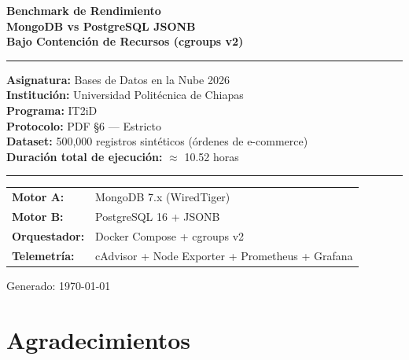 \documentclass[12pt,a4paper]{article}
\begin{document}

\begin{titlepage}
  \centering
  \vspace*{1cm}

  {\Huge\bfseries\color{headerbg}
    Benchmark de Rendimiento\\[0.4em]
    \large\color{pgblue} MongoDB vs PostgreSQL JSONB\\
    \large\color{mongogreen} Bajo Contención de Recursos (cgroups v2)
  }

  \vspace{1.5cm}
  \rule{\linewidth}{0.5mm}
  \vspace{0.5cm}

  {\large
    \textbf{Asignatura:} Bases de Datos en la Nube 2026\\[0.3em]
    \textbf{Institución:} Universidad Politécnica de Chiapas\\[0.3em]
    \textbf{Programa:} IT2iD\\[0.3em]
    \textbf{Protocolo:} PDF §6 — Estricto\\[0.3em]
    \textbf{Dataset:} 500{,}000 registros sintéticos (órdenes de e-commerce)\\[0.3em]
    \textbf{Duración total de ejecución:} $\approx$ 10.52 horas
  }

  \vspace{1cm}
  \rule{\linewidth}{0.5mm}
  \vspace{1cm}

  \begin{tabular}{ll}
    \textbf{Motor A:}    & MongoDB 7.x (WiredTiger) \\
    \textbf{Motor B:}    & PostgreSQL 16 + JSONB \\
    \textbf{Orquestador:} & Docker Compose + cgroups v2 \\
    \textbf{Telemetría:} & cAdvisor + Node Exporter + Prometheus + Grafana \\
  \end{tabular}

  \vfill
  {\small Generado: \today}
\end{titlepage}

\tableofcontents
\newpage

\section*{Agradecimientos}
\end{document}
